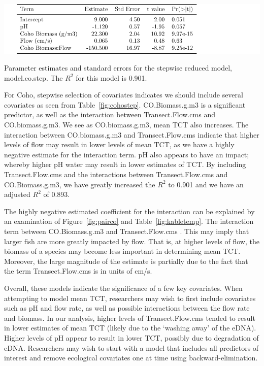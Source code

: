 \vspace{5mm}

\begin{table}[H]
\includegraphics{Chapter5Images/cohored.pdf}
\caption{Parameter estimates and standard errors for the stepwise reduced model, model.co.step. The $R^{2}$ for this model is 0.901.}
\label{fig:cohostep}
\end{table}



For Coho, stepwise selection of covariates indicates we should include several covariates as seen from Table~\ref{fig:cohostep}. CO.Biomass.g.m3 is a significant predictor, as well as the interaction between Transect.Flow.cms and CO.biomass.g.m3. We see as CO.biomass.g.m3, mean TCT also increases.  The interaction between CO.biomass.g.m3 and Transect.Flow.cms indicate that higher levels of flow may result in lower levels of mean TCT, as we have a highly negative estimate for the interaction term. pH also appears to have an impact; whereby higher pH water may result in lower estimates of TCT. By including Transect.Flow.cms and the interactions between Transect.Flow.cms and CO.Biomass.g.m3, we have greatly increased the $R^{2}$ to 0.901 and we have an adjusted $R^{2}$ of 0.893.

\vspace{3mm}

The highly negative estimated coefficient for the interaction can be explained by an examination of Figure~\ref{fig:pairco} and Table~\ref{fig:kabletemp}. The interaction term between CO.Biomass.g.m3 and Transect.Flow.cms . This may imply that larger fish are more greatly impacted by flow. That is, at higher levels of flow, the biomass of a species may become less important in determining mean TCT. Moreover, the large magnitude of the estimate is partially due to the fact that the term Transect.Flow.cms is in units of cm/s.

\vspace{3mm}

Overall, these models indicate the significance of a few key covariates. When attempting to model mean TCT, researchers may wish to first include covariates such as pH and flow rate, as well as possible interactions between the flow rate and biomass. In our analysis, higher levels of Transect.Flow.cms tended to result in lower estimates of mean TCT (likely due to the `washing away' of the eDNA). Higher levels of pH appear to result in lower TCT, possibly due to degradation of eDNA. Researchers may wish to start with a model that includes all predictors of interest and  remove ecological covariates one at time using backward-elimination.

